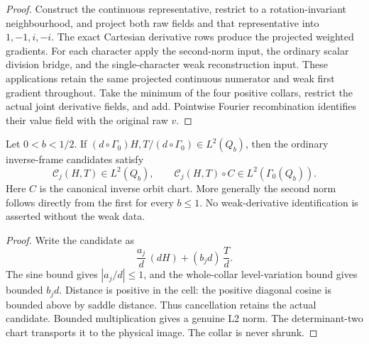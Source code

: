 \begin{proof}
\leanok
Construct the continuous representative, restrict to a rotation-invariant
neighbourhood, and project both raw fields and that representative into
$1,-1,i,-i$. The exact Cartesian derivative rows produce the projected
weighted gradients. For each character apply the second-norm input, the
ordinary scalar division bridge, and the single-character weak reconstruction
input. These applications retain the same projected continuous numerator
and weak first gradient throughout.
Take the minimum of the four positive collars, restrict the actual joint
derivative fields, and add. Pointwise Fourier recombination identifies their
value field with the original raw $v$.
\end{proof}

\begin{lemma}
\label{lem:ordinary-quarter-gradient-norm}
\leanok
Let $0<b<1/2$. If
$(d\circ\Gamma_0)H,T/(d\circ\Gamma_0)\in L^2(Q_b)$, then the ordinary
inverse-frame candidates satisfy
\[
 \mathcal C_j(H,T)\in L^2(Q_b),\qquad
 \mathcal C_j(H,T)\circ C\in L^2(\Gamma_0(Q_b)).
\]
Here $C$ is the canonical inverse orbit chart.
More generally the second norm follows directly from the first for every
$b\le1$. No weak-derivative identification is asserted without the weak data.
\end{lemma}

\begin{proof}
\leanok
Write the candidate as
\[
 \frac{a_j}{d}\,(dH)+(b_jd)\,\frac{T}{d}.
\]
The sine bound gives $|a_j/d|\le1$, and the whole-collar level-variation
bound gives bounded $b_jd$.
Distance is positive in the cell: the positive diagonal cosine is bounded
above by saddle distance. Thus cancellation retains the actual candidate.
Bounded multiplication gives a genuine L2 norm. The determinant-two chart
transports it to the physical image. The collar is never shrunk.
\end{proof}

